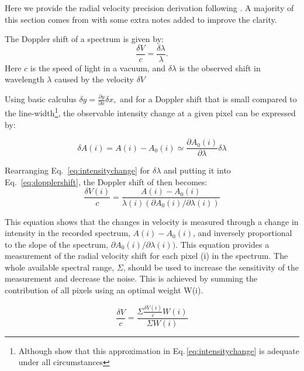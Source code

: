 Here we provide the radial velocity precision derivation following \citet{Connes1985, bouchy_fundamental_2001, figueira_radial_2016}. A majority of this section comes from \citet{bouchy_fundamental_2001} with some extra notes added to improve the clarity.

The Doppler shift of a spectrum is given by:
\begin{equation}
\frac{\delta V}{c} = \frac{\delta \lambda}{\lambda}.
\label{eq:dopplershift}
\end{equation}
Here $c$ is the speed of light in a vacuum, and $\delta \lambda$ is the observed shift in wavelength $\lambda$ caused by the velocity $\delta V$

Using basic calculus \(\delta y = \frac{\partial y}{\partial x} \delta x,  \nonumber\) and for a Doppler shift that is small compared to the line-width\footnote{Although \citet{Connes1985} show that this approximation in Eq.\,\ref{eq:intensitychange} is adequate under all circumstances}, the observable intensity change at a given pixel can be expressed by:

\begin{equation}
\delta A(i) = A(i) - A_0(i) \simeq \frac{\partial A_0(i)}{\partial \lambda} \delta \lambda
\label{eq:intensitychange}
\end{equation}

Rearranging Eq.~\ref{eq:intensitychange} for \(\delta \lambda\) and putting it into Eq.~\ref{eq:dopplershift}, the Doppler shift of then becomes:
\begin{equation}
    \frac{\delta V(i)}{c} = \frac{A(i) - A_0(i) }{\lambda(i) (\partial A_0(i)/\partial \lambda(i))} \label{eq:delta_v_i}
\end{equation}

This equation shows that the changes in velocity is measured through a change in intensity in the recorded spectrum, \(A(i)-A_0(i)\), and inversely proportional to the slope of the spectrum, \(\partial A_0(i)/\partial \lambda(i))\). 
This equation provides a measurement of the radial velocity shift for each pixel (i) in the spectrum. The whole available spectral range, $\Sigma$, should be used to increase the sensitivity of the measurement and decrease the noise. This is achieved by summing the contribution of all pixels using an optimal weight W(i).

\begin{equation}
\frac{\delta V}{c} = \frac{\Sigma{ \frac{\delta V(i)}{c}W(i)}}{\Sigma {W(i)}}
\end{equation}

